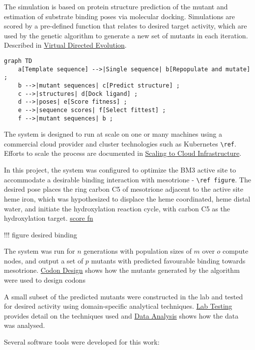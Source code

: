 The simulation is based on protein structure prediction of the mutant
and estimation of substrate binding poses via molecular docking.
Simulations are scored by a pre-defined function that relates to desired
target activity, which are used by the genetic algorithm to generate a
new set of mutants in each iteration. Described in
\protect\hyperlink{vde}{Virtual Directed Evolution}.

\begin{verbatim}
graph TD
    a[Template sequence] -->|Single sequence| b[Repopulate and mutate] ; 
    b -->|mutant sequences| c[Predict structure] ; 
    c -->|structures| d[Dock ligand] ;
    d -->|poses| e[Score fitness] ; 
    e -->|sequence scores| f[Select fittest] ;
    f -->|mutant sequences| b ;
\end{verbatim}

The system is designed to run at scale on one or many machines using a
commercial cloud provider and cluster technologies such as Kubernetes
\texttt{\textbackslash{}ref}. Efforts to scale the process are
documented in \protect\hyperlink{k8}{Scaling to Cloud Infrastructure}.

In this project, the system was configured to optimize the BM3 active
site to accommodate a desirable binding interaction with mesotrione -
\texttt{\textbackslash{}ref\ figure}. The desired pose places the ring
carbon C5 of mesotrione adjacent to the active site heme iron, which was
hypothesized to displace the heme coordinated, heme distal water, and
initiate the hydroxylation reaction cycle, with carbon C5 as the
hydroxylation target. \protect\hyperlink{sfxn}{score fn}

!!! figure desired binding

The system was run for \(n\) generations with population sizes of \(m\)
over \(o\) compute nodes, and output a set of \(p\) mutants with
predicted favourable binding towards mesotrione.
\protect\hyperlink{codons}{Codon Design} shows how the mutants generated
by the algorithm were used to design codons

A small subset of the predicted mutants were constructed in the lab and
tested for desired activity using domain-specific analytical techniques.
\protect\hyperlink{lab}{Lab Testing} provides detail on the techniques
used and \protect\hyperlink{analysis}{Data Analysis} shows how the data
was analysed.

Several software tools were developed for this work:

